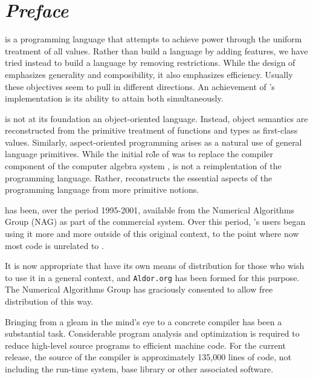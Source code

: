 \chapter*{\textit{Preface}}

\asharpfull{} is a programming language that attempts to achieve
power through the uniform treatment of all values.
Rather than build a language by adding features, we have tried instead
to build a language by removing restrictions.
While the design of \asharp{} emphasizes generality and composibility,
it also emphasizes efficiency.
Usually these objectives seem to pull in different directions.
An achievement of \asharp{}'s implementation is its ability
to attain both simultaneously.

\asharp{} is not at its foundation an object-oriented language.
Instead, object semantics are reconstructed from the primitive treatment
of functions and types as first-class values.  Similarly, aspect-oriented
programming arises as a natural use of general language primitives.
While the initial ro\^le of \asharp{} was to replace the compiler component 
of the computer algebra system \axiom{}, \asharp{} is not a reimplentation 
of the \axiom{} programming language.  Rather, \asharp{} reconstructs 
the essential aspects of the \axiom{} programming language from more 
primitive notions.

\aldor{} has been, over the period 1995-2001, available from the 
Numerical Algorithms Group (NAG) as part of the commercial \axiom{} system.
Over this period, \aldor{}'s users began using it more and more outside 
of this original context, to the point where now most \aldor{} code
is unrelated to \axiom{}.   

It is now appropriate that \aldor{} have its own means of distribution 
for those who wish to use it in a general context, and {\tt Aldor.org} 
has been formed for this purpose.  The Numerical Algorithms Group has 
graciously consented to allow free distribution of \aldor{} this way.

Bringing \asharp{} from a gleam in the mind's eye to a concrete 
compiler has been a substantial task.  Considerable program analysis 
and optimization is required to reduce high-level source programs to 
efficient machine code.  For the current release, the source of the 
compiler is approximately 135,000 lines of code, not including the 
run-time system, base library or other associated software.   

